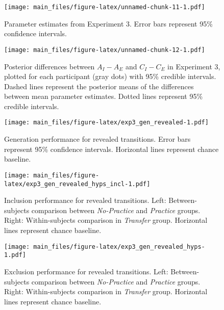 \documentclass[floatsintext,man]{apa6}
\begin{document}
\begin{figure}[htbp]
\centering
\texttt{[image: main\_files/figure-latex/unnamed-chunk-11-1.pdf]}
\caption{Parameter estimates from Experiment 3. Error bars represent
95\% confidence intervals.}
\end{figure}

\begin{figure}[htbp]
\centering
\texttt{[image: main\_files/figure-latex/unnamed-chunk-12-1.pdf]}
\caption{Posterior differences between \(A_I - A_E\) and \(C_I - C_E\)
in Experiment 3, plotted for each participant (gray dots) with 95\%
credible intervals. Dashed lines represent the posterior means of the
differences between mean parameter estimates. Dotted lines represent
95\% credible intervals.}
\end{figure}

\begin{figure}[htbp]
\centering
\texttt{[image: main\_files/figure-latex/exp3\_gen\_revealed-1.pdf]}
\caption{Generation performance for revealed transitions. Error bars
represent 95\% confidence intervals. Horizontal lines represent chance
baseline.}
\end{figure}

\begin{figure}[htbp]
\centering
\texttt{[image: main\_files/figure-latex/exp3\_gen\_revealed\_hyps\_incl-1.pdf]}
\caption{Inclusion performance for revealed transitions. Left:
Between-subjects comparison between \emph{No-Practice} and
\emph{Practice} groups. Right: Within-subjects comparison in
\emph{Transfer} group. Horizontal lines represent chance baseline.}
\end{figure}

\begin{figure}[htbp]
\centering
\texttt{[image: main\_files/figure-latex/exp3\_gen\_revealed\_hyps-1.pdf]}
\caption{Exclusion performance for revealed transitions. Left:
Between-subjects comparison between \emph{No-Practice} and
\emph{Practice} groups. Right: Within-subjects comparison in
\emph{Transfer} group. Horizontal lines represent chance baseline.}
\end{figure}
\end{document}
